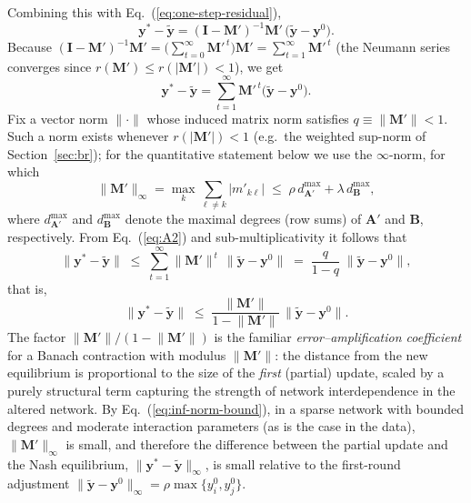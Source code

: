 Combining this with Eq.~(\ref{eq:one-step-residual}),
\begin{equation}
  \mathbf y^{\ast}-\widetilde{\mathbf y}
      = (\mathbf I-\mathbf M')^{-1}\mathbf M'\,
        \bigl(\widetilde{\mathbf y}-\mathbf y^{0}\bigr).
\label{eq:A1}
\end{equation}
Because
\(\displaystyle
   (\mathbf I-\mathbf M')^{-1}\mathbf M'
      =\bigl(\textstyle\sum_{t=0}^{\infty}\mathbf M'^{\,t}\bigr)\mathbf M'
      =\sum_{t=1}^{\infty}\mathbf M'^{\,t}
\)
(the Neumann series converges since $r(\mathbf M')\le r(|\mathbf M'|)<1$), we get
\begin{equation}
\mathbf y^{\ast}-\widetilde{\mathbf y}
   =\sum_{t=1}^{\infty}\mathbf M'^{\,t}
      \bigl(\widetilde{\mathbf y}-\mathbf y^{0}\bigr).
\label{eq:A2}
\end{equation}
Fix a vector norm $\lVert\cdot\rVert$ whose induced matrix norm satisfies
$q\equiv\lVert\mathbf M'\rVert<1$. Such a norm exists whenever $r(|\mathbf M'|)<1$ (e.g.\ the weighted sup-norm of Section~\ref{sec:br}); for the quantitative statement below we use the $\infty$-norm, for which
\begin{equation}
\lVert\mathbf M'\rVert_{\infty}
   =\max_{k}\sum_{\ell\neq k}\bigl|m'_{k\ell}\bigr|
   \;\le\;
   \rho\, d^{\max}_{\mathbf A'}+\lambda\, d^{\max}_{\mathbf B},
\label{eq:inf-norm-bound}
\end{equation}
where $d^{\max}_{\mathbf A'}$ and $d^{\max}_{\mathbf B}$ denote the maximal degrees (row sums) of $\mathbf A'$ and $\mathbf B$, respectively. From Eq.~(\ref{eq:A2}) and sub-multiplicativity it follows that
\begin{equation}
\bigl\lVert\mathbf y^{\ast}-\widetilde{\mathbf y}\bigr\rVert
  \;\le\;
  \sum_{t=1}^{\infty}\lVert\mathbf M'\rVert^{\,t}
     \,\bigl\lVert\widetilde{\mathbf y}-\mathbf y^{0}\bigr\rVert
  \;=\;
  \frac{q}{1-q}\;
  \bigl\lVert\widetilde{\mathbf y}-\mathbf y^{0}\bigr\rVert,
\label{eq:A3}
\end{equation}
that is,
\begin{equation}
\bigl\lVert\mathbf y^{\ast}-\widetilde{\mathbf y}\bigr\rVert
   \;\le\;
   \frac{\lVert\mathbf M'\rVert}{1-\lVert\mathbf M'\rVert}\,
   \bigl\lVert\widetilde{\mathbf y}-\mathbf y^{0}\bigr\rVert .
\label{eq:bound-final}
\end{equation}
The factor $\lVert\mathbf M'\rVert/(1-\lVert\mathbf M'\rVert)$ is the familiar \emph{error--amplification coefficient} for a Banach contraction with modulus $\lVert\mathbf M'\rVert$: the distance from the new equilibrium is proportional to the size of the \emph{first} (partial) update, scaled by a purely structural term capturing the strength of network interdependence in the altered network. By Eq.~(\ref{eq:inf-norm-bound}), in a sparse network with bounded degrees and moderate interaction parameters (as is the case in the data), $\lVert\mathbf M'\rVert_{\infty}$ is small, and therefore the difference between the partial update and the Nash equilibrium, $\lVert\mathbf y^{\ast}-\widetilde{\mathbf y}\rVert_{\infty}$, is small relative to the first-round adjustment $\lVert\widetilde{\mathbf y}-\mathbf y^{0}\rVert_{\infty}=\rho\max\{y^{0}_i,y^{0}_j\}$.

